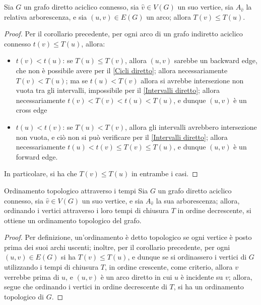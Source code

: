 \documentclass[a4paper, 12pt]{report}
\begin{document}
    \begin{framedcor}{}
        Sia $G$ un grafo diretto aciclico connesso, sia $\hat v \in V(G)$ un suo vertice, sia $A_{\hat v}$ la relativa arborescenza, e sia $(u, v) \in E(G)$ un arco; allora $T(v) \le T(u)$.
    \end{framedcor}

    \begin{proof}
        Per il corollario precedente, per ogni arco di un grafo indiretto aciclico connesso $t(v) \le T(u)$, allora:
        \begin{itemize}
            \item $t(v) < t(u)$: se $T(u) \le T(v)$, allora $(u, v)$ sarebbe un backward edge, che non è possibile avere per il \cref{Cicli diretto}; allora necessariamente $T(v) < T(u)$; ma se $t(u) < T(v)$ allora si avrebbe intersezione non vuota tra gli intervalli, impossibile per il \cref{Intervalli diretto}; allora necessariamente $t(v) < T(v) < t(u) < T(u)$, e dunque $(u, v)$ è un cross edge
            \item $t(u) < t(v)$: se $T(u) < T(v)$, allora gli intervalli avrebbero intersezione non vuota, e ciò non si può verificare per il \cref{Intervalli diretto}; allora necessariamente $t(u) < t(v) \le T(v) \le T(u)$, e dunque $(u, v)$ è un forward edge.
        \end{itemize}

        In particolare, si ha che $T(v) \le T(u)$ in entrambe i casi.
    \end{proof}

    \begin{framedthm}{Ordinamento topologico attraverso i tempi}
        Sia $G$ un grafo diretto aciclico connesso, sia $\hat v \in V(G)$ un suo vertice, e sia $A_{\hat v}$ la sua arborescenza; allora, ordinando i vertici attraverso i loro tempi di chiusura $T$ in ordine decrescente, si ottiene un ordinamento topologico del grafo.
    \end{framedthm}

    \begin{proof}
        Per definizione, un'ordinamento è detto topologico se ogni vertice è posto prima dei suoi archi uscenti; inoltre, per il corollario precedente, per ogni $(u, v) \in E(G)$ si ha $T(v) \le T(u)$, e dunque se si ordinassero i vertici di $G$ utilizzando i tempi di chiusura $T$, in ordine crescente, come criterio, allora $v$ verrebbe prima di $u$, e $(u, v)$ è un arco diretto in cui $u$ è incidente su $v$; allora, segue che ordinando i vertici in ordine decrescente di $T$, si ha un ordinamento topologico di $G$.
    \end{proof}
\end{document}
